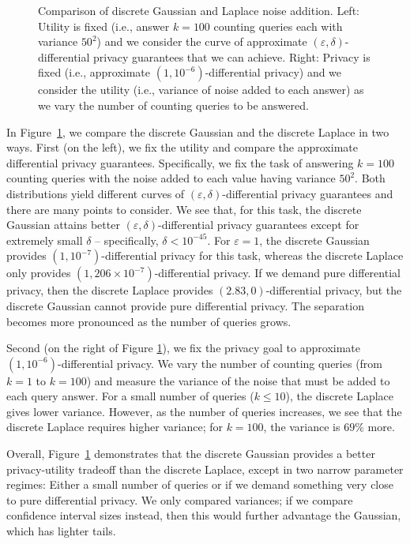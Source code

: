 \documentclass{jpc}
\begin{document}
\begin{figure}[ht!]
\begin{minipage}{0.5\textwidth}
    \end{minipage}
    \caption{\label{fig:gausslaplace} Comparison of discrete Gaussian and Laplace noise addition. Left: Utility is fixed (i.e., answer $k=100$ counting queries each with variance $50^2$) and we consider the curve of approximate $(\varepsilon,\delta)$-differential privacy guarantees that we can achieve. Right: Privacy is fixed (i.e., approximate $(1,10^{-6})$-differential privacy) and we consider the utility (i.e., variance of noise added to each answer) as we vary the number of counting queries to be answered.}
\end{figure}

In Figure~\ref{fig:gausslaplace}, we compare the discrete Gaussian and the discrete Laplace in two ways. First (on the left), we fix the utility and compare the approximate differential privacy guarantees. Specifically, we fix the task of answering $k=100$ counting queries with the noise added to each value having variance $50^2$. Both distributions yield different curves of $(\varepsilon,\delta)$-differential privacy guarantees and there are many points to consider. We see that, for this task, the discrete Gaussian attains better $(\varepsilon,\delta)$-differential privacy guarantees except for extremely small $\delta$ -- specifically, $\delta<10^{-45}$. For $\varepsilon=1$, the discrete Gaussian provides $(1,10^{-7})$-differential privacy for this task, whereas the discrete Laplace only provides $(1,206 \times 10^{-7})$-differential privacy. If we demand pure differential privacy, then the discrete Laplace provides $(2.83,0)$-differential privacy, but the discrete Gaussian cannot provide pure differential privacy. The separation becomes more pronounced as the number of queries grows.

Second (on the right of Figure \ref{fig:gausslaplace}), we fix the privacy goal to approximate $(1,10^{-6})$-differential privacy. We vary the number of counting queries (from $k=1$ to $k=100$) and measure the variance of the noise that must be added to each query answer. For a small number of queries ($k \le 10$), the discrete Laplace gives lower variance. However, as the number of queries increases, we see that the discrete Laplace requires higher variance; for $k=100$, the variance is $69\%$ more.

Overall, Figure~\ref{fig:gausslaplace} demonstrates that the discrete Gaussian provides a better privacy-utility tradeoff than the discrete Laplace, except in two narrow parameter regimes: Either a small number of queries or if we demand something very close to pure differential privacy. We only compared variances; if we compare confidence interval sizes instead, then this would further advantage the Gaussian, which has lighter tails.
\end{document}
